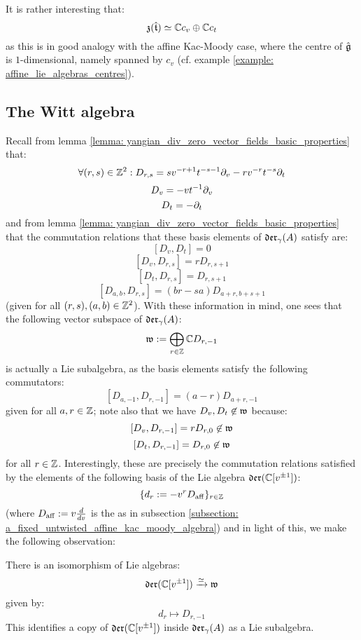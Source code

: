         \begin{remark}
            It is rather interesting that:
                $$\mathfrak{z}(\hat{\mathfrak{t}}) \simeq \mathbb{C} c_v \oplus \mathbb{C} c_t$$
            as this is in good analogy with the affine Kac-Moody case, where the centre of $\hat{\mathfrak{g}}$ is $1$-dimensional, namely spanned by $c_v$ (cf. example \ref{example: affine_lie_algebras_centres}).
        \end{remark}

    \subsection{The Witt algebra}
        Recall from lemma \ref{lemma: yangian_div_zero_vector_fields_basic_properties} that:
            $$\forall (r, s) \in \mathbb{Z}^2: D_{r, s} = s v^{-r + 1} t^{-s - 1} \partial_v - r v^{-r} t^{-s} \partial_t$$
            $$D_v = -v t^{-1} \partial_v$$
            $$D_t = -\partial_t$$
        and from lemma \ref{lemma: yangian_div_zero_vector_fields_basic_properties} that the commutation relations that these basis elements of $\mathfrak{der}_{\gamma}(A)$ satisfy are:
            $$[D_v, D_t] = 0$$
            $$[D_v, D_{r, s}] = r D_{r, s + 1}$$
            $$[D_t, D_{r, s}] = D_{r, s + 1}$$
            $$[D_{a, b}, D_{r, s}] = (br - sa) D_{a + r, b + s + 1}$$
        (given for all $(r, s), (a, b) \in \mathbb{Z}^2$). With these information in mind, one sees that the following vector subspace of $\mathfrak{der}_{\gamma}(A)$:
            $$\mathfrak{w} := \bigoplus_{r \in \mathbb{Z}} \mathbb{C} D_{r, -1}$$
        is actually a Lie subalgebra, as the basis elements satisfy the following commutators:
            $$[D_{a, -1}, D_{r, -1}] = (a - r) D_{a + r, -1}$$
        given for all $a, r \in \mathbb{Z}$; note also that we have $D_v, D_t \not \in \mathfrak{w}$ because:
            $$[D_v, D_{r, -1}] = r D_{r, 0} \not \in \mathfrak{w}$$
            $$[D_t, D_{r, -1}] = D_{r, 0} \not \in \mathfrak{w}$$    
        for all $r \in \mathbb{Z}$. Interestingly, these are precisely the commutation relations satisfied by the elements of the following basis of the Lie algebra $\mathfrak{der}(\mathbb{C}[v^{\pm 1}])$:
            $$\{ d_r := -v^r D_{\mathrm{aff}} \}_{r \in \mathbb{Z}}$$
        (where $D_{\mathrm{aff}} := v \frac{d}{dv}$ is the  as in subsection \ref{subsection: a_fixed_untwisted_affine_kac_moody_algebra}) and in light of this, we make the following observation:
        \begin{lemma} \label{lemma: a_copy_of_the_witt_algebra_inside_the_lie_algebra_of_yangian_div_zero_vector_fields}
            There is an isomorphism of Lie algebras:
                $$\mathfrak{der}(\mathbb{C}[v^{\pm 1}]) \xrightarrow[]{\simeq} \mathfrak{w}$$
            given by:
                $$d_r \mapsto D_{r, -1}$$
            This identifies a copy of $\mathfrak{der}(\mathbb{C}[v^{\pm 1}])$ inside $\mathfrak{der}_{\gamma}(A)$ as a Lie subalgebra. 
        \end{lemma}